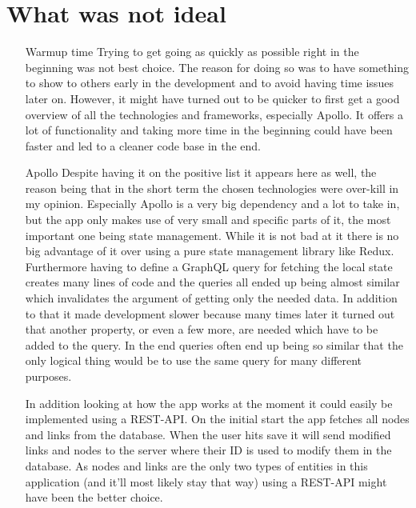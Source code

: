 \section{What was not ideal}
\begin{itemize}
\item[Warmup time] Trying to get going as quickly as possible right in the beginning was not best choice. The reason for doing so was to have something to show to others early in the development and to avoid having time issues later on. However, it might have turned out to be quicker to first get a good overview of all the technologies and frameworks, especially Apollo. It offers a lot of functionality and taking more time in the beginning could have been faster and led to a cleaner code base in the end.

\item[Apollo] Despite having it on the positive list it appears here as well, the reason being that in the short term the chosen technologies were over-kill in my opinion. Especially Apollo is a very big dependency and a lot to take in, but the app only makes use of very small and specific parts of it, the most important one being state management. While it is not bad at it there is no big advantage of it over using a pure state management library like Redux. Furthermore having to define a GraphQL query for fetching the local state creates many lines of code and the queries all ended up being almost similar which invalidates the argument of getting only the needed data. In addition to that it made development slower because many times later it turned out that another property, or even a few more, are needed which have to be added to the query. In the end queries often end up being so similar that the only logical thing would be to use the same query for many different purposes.

In addition looking at how the app works at the moment it could easily be implemented using a REST-API. On the initial start the app fetches all nodes and links from the database. When the user hits save it will send modified links and nodes to the server where their ID is used to modify them in the database. As nodes and links are the only two types of entities in this application (and it'll most likely stay that way) using a REST-API might have been the better choice.
\end{itemize}


